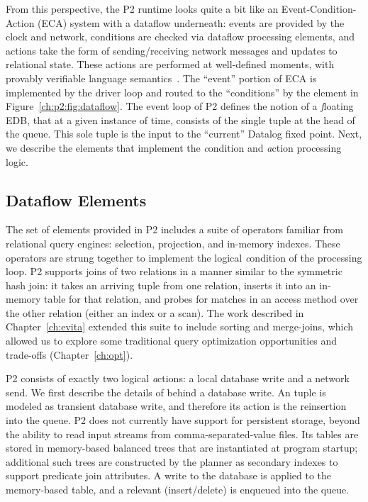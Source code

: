 From this perspective, the P2 runtime looks quite a bit like an
Event-Condition-Action (ECA) system with a dataflow underneath: events are
provided by the clock and network, conditions are checked via dataflow
processing elements, and actions take the form of sending/receiving network
messages and updates to relational state.  These actions are performed at
well-defined moments, with provably verifiable language
semantics~\cite{boon-thesis}.  The ``event'' portion of ECA is implemented by
the driver loop and routed to the ``conditions'' by the  element in
Figure~\ref{ch:p2:fig:dataflow}.  The event loop of P2 defines the notion of a
{\emph floating} EDB, that at a given instance of time, consists of the single
tuple at the head of the  queue.  This sole tuple is the input to the
``current'' Datalog fixed point.  Next, we describe the elements that implement
the {\emph condition} and {\emph action} processing logic.

\subsection{Dataflow Elements} 
\label{ch:p2:sec:dataflow_elements}

The set of elements provided in P2 includes a suite of operators familiar from
relational query engines: selection, projection, and in-memory indexes.  These
operators are strung together to implement the logical {\emph condition} of the 
processing loop.  P2 supports joins of two relations in a manner similar to the
symmetric hash join: it takes an arriving tuple from one relation, inserts it
into an in-memory table for that relation, and probes for matches in an access
method over the other relation (either an index or a scan).  The work described
in Chapter~\ref{ch:evita} extended this suite to include sorting and
merge-joins, which allowed us to explore some traditional query optimization
opportunities and trade-offs (Chapter~\ref{ch:opt}).

P2 consists of exactly two logical {\emph actions}: a local database write and
a network send.  We first describe the details of behind a database write.  An
 tuple is modeled as transient database write, and therefore its
action is the reinsertion into the  queue.  P2 does not currently
have support for persistent storage, beyond the ability to read input streams
from comma-separated-value files.  Its tables are stored in memory-based
balanced trees that are instantiated at program startup; additional such trees
are constructed by the planner as secondary indexes to support predicate join
attributes.  A write to the database is applied to the memory-based table, and
a relevant (insert/delete)  is enqueued into the  queue.

